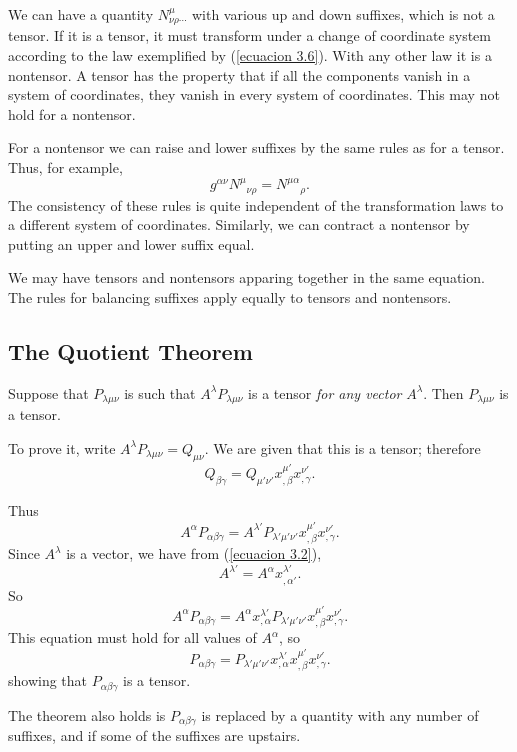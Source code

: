 
We can have a quantity $N^{\mu}_{\nu\rho\cdots}$ with various up and down 
suffixes, which is not a tensor. If it is a tensor, it must transform under a 
change of coordinate system according to the law exemplified by (\ref{ecuacion 
3.6}). With any other law it is a nontensor. A tensor has the property that if 
all the components vanish in a system of coordinates, they vanish in every 
system of coordinates. This may not hold for a nontensor.

For a nontensor we can raise and lower suffixes by the same rules as for a 
tensor. Thus, for example,
\[
    g^{\alpha\nu} {N^{\mu}}_{\nu\rho} = {N^{\mu\alpha}}_{\rho}.
\]
The consistency of these rules is quite independent of the transformation laws 
to a different system of coordinates. Similarly, we can contract a nontensor by 
putting an upper and lower suffix equal.

We may have tensors and nontensors apparing together in the same equation. The 
rules for balancing suffixes apply  equally to tensors and nontensors.

\subsection{The Quotient Theorem}
Suppose that $P_{\lambda\mu\nu}$ is such that $A^\lambda P_{\lambda\mu\nu}$ is 
a tensor \emph{for any vector} $A^\lambda$. Then $P_{\lambda\mu\nu}$ is a 
tensor.

To prove it, write $A^\lambda P_{\lambda\mu\nu} = Q_{\mu\nu}$. We are given 
that this is a tensor; therefore
\[
 Q_{\beta\gamma} = Q_{\mu'\nu'} x^{\mu'}_{,\beta} x^{\nu'}_{,\gamma}.
\]

Thus 
\[
A^\alpha P_{\alpha\beta\gamma} = A^{\lambda'}P_{\lambda'\mu'\nu'}
        x^{\mu'}_{,\beta}x^{\nu'}_{,\gamma}.
\]
Since $A^\lambda$ is a vector, we have from (\ref{ecuacion 3.2}),
\[
 A^{\lambda'} = A^\alpha x^{\lambda'}_{,\alpha'}.
\]
So
\[
A^\alpha P_{\alpha\beta\gamma} = 
A^\alpha 
x^{\lambda'}_{,\alpha}P_{\lambda'\mu'\nu'} x^{\mu'}_{,\beta}x^{\nu'}_{,\gamma}.
\]
This equation must hold for all values of $A^\alpha$, so
\[
P_{\alpha\beta\gamma} = 
P_{\lambda'\mu'\nu'} x^{\lambda'}_{,\alpha} x^{\mu'}_{,\beta}x^{\nu'}_{,\gamma}.
\]
showing that $P_{\alpha\beta\gamma}$ is a tensor.

The theorem also holds is $P_{\alpha\beta\gamma}$ is replaced by a quantity 
with any number of suffixes, and if some of the suffixes are upstairs.

